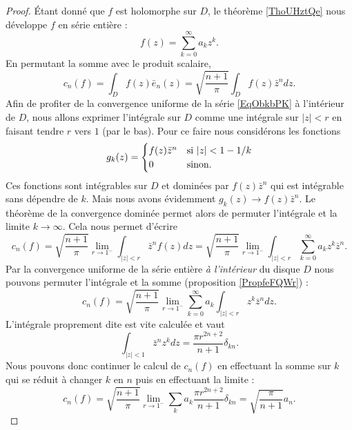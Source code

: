 \begin{proof}
    Étant donné que \( f\) est holomorphe sur \( D\), le théorème \ref{ThoUHztQe} nous développe \( f\) en série entière :
    \begin{equation}    \label{EqObkbPK}
        f(z)=\sum_{k=0}^{\infty}a_kz^k.
    \end{equation}
    En permutant la somme avec le produit scalaire,
    \begin{equation}
        c_n(f)=\int_Df(z)\bar e_n(z)=\sqrt{\frac{ n+1 }{ \pi }}\int_Df(z)\bar z^ndz.
    \end{equation}
    Afin de profiter de la convergence uniforme de la série \eqref{EqObkbPK} à l'intérieur de \( D\), nous allons exprimer l'intégrale sur \( D\) comme une intégrale sur \( | z |<r\) en faisant tendre \( r\) vers \( 1\) (par le bas). Pour ce faire nous considérons les fonctions
    \begin{equation}
        g_k(z)=\begin{cases}
            f(z)\bar z^n    &   \text{si \( | z |<1-1/k\)}\\
            0    &    \text{sinon.}
        \end{cases}
    \end{equation}
    Ces fonctions sont intégrables sur \( D\) et dominées par \( f(z)\bar z^n\) qui est intégrable sans dépendre de \( k\). Mais nous avons évidemment \( g_k(z)\to f(z)\bar z^n\). Le théorème de la convergence dominée permet alors de permuter l'intégrale et la limite \( k\to \infty\). Cela nous permet d'écrire
    \begin{equation}
        c_n(f)=\sqrt{\frac{ n+1 }{ \pi }}\lim_{r\to 1^-}\int_{| z |<r}\bar z^nf(z)dz=\sqrt{\frac{ n+1 }{ \pi }}\lim_{r\to 1^-}\int_{| z |<r}\sum_{k=0}^{\infty}a_kz^k\bar z^n.
    \end{equation}
    Par la convergence uniforme de la série entière \emph{à l'intérieur} du disque \( D\) nous pouvons permuter l'intégrale et la somme (proposition \ref{PropfeFQWr}) :
    \begin{equation}
        c_n(f)=\sqrt{\frac{ n+1 }{ \pi }}\lim_{r\to 1^-}\sum_{k=0}^{\infty}a_k\int_{| z |<r}z^k\bar z^ndz.
    \end{equation}
    L'intégrale proprement dite est vite calculée et vaut
    \begin{equation}
        \int_{| z |<1}\bar z^nz^kdz=\frac{ \pi r^{2n+2} }{ n+1 }\delta_{kn}.
    \end{equation}
    Nous pouvons donc continuer le calcul de \( c_n(f)\) en effectuant la somme sur \( k\) qui se réduit à changer \( k\) en \( n\) puis en effectuant la limite :
    \begin{equation}
        c_n(f)=\sqrt{\frac{ n+1 }{ \pi }}\lim_{r\to 1^-}\sum_ka_k\frac{ \pi r^{2n+2} }{ n+1 }\delta_{kn}=\sqrt{\frac{ \pi }{ n+1 }}a_n.
    \end{equation}
    

\end{proof}

